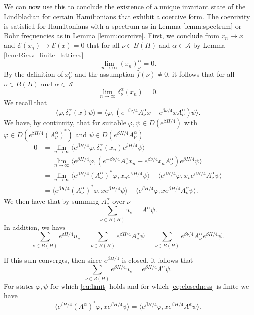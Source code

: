 \documentclass[11pt]{amsart}
\newcommand{\1}{\mathbbm{1}}
\theoremstyle{plain}
\theoremstyle{definition}
\theoremstyle{remark}
\numberwithin{equation}{section}
\begin{document}
We can now use this to conclude the existence of a unique invariant state of the Lindbladian for certain Hamiltonians that exhibit a coercive form. The coercivity is satisfied for Hamiltonians with a spectrum as in Lemma \ref{lemm:spectrum} or Bohr frequencies as in Lemma \ref{lemm:coercive}.  First, we conclude from $x_n \to x$ and $\mathcal E(x_n) \to \mathcal E(x)=0$ that for all $\nu\in B(H)$ and $ \alpha\in\mathcal A$ by Lemma \ref{lem:Riesz_finite_lattices}
\[
\lim_{n \to \infty} (x_n)_\nu^\alpha=0.
\]
By the definition of $x_\nu^\alpha$ and the assumption $\widehat f(\nu)\neq 0$, it follows that for all $\nu\in B(H)$ and $ \alpha\in\mathcal A$
\[
\lim_{n \to \infty} \delta_\nu^\alpha(x_n)=0.
\]
We recall that 
\[
\langle \varphi, \delta_\nu^\alpha(x) \psi\rangle=\langle \varphi, (e^{-\beta \nu/4}A_\nu^\alpha x-e^{\beta \nu/4}xA_\nu^\alpha) \psi\rangle.
\]
We have, by continuity, that for suitable $\varphi,\psi \in D(e^{\beta H/4})$ with $\varphi \in D(e^{\beta H/4} (A_\nu^\alpha)^*)$ and $\psi \in D(e^{\beta H/4} A_\nu^\alpha )$
\begin{equation}
\label{eq:limit}
\begin{split}
0&=\lim_{n \rightarrow \infty} \langle e^{\beta H/4} \varphi, \delta_\nu^\alpha(x_n) e^{\beta H/4}\psi\rangle\\
&=\lim_{n \rightarrow \infty}\langle e^{\beta H/4} \varphi, (e^{-\beta \nu/4}A_\nu^\alpha x_n-e^{\beta \nu/4}x_nA_\nu^\alpha) e^{\beta H/4} \psi\rangle \\
&=\lim_{n \rightarrow \infty}\langle e^{\beta H/4} (A_\nu^\alpha)^* \varphi,  x_ne^{\beta H/4} \psi\rangle-\langle e^{\beta H/4} \varphi, x_n e^{\beta H/4} A_\nu^\alpha \psi\rangle\\
&=\langle e^{\beta H/4} (A_\nu^\alpha)^* \varphi,  xe^{\beta H/4} \psi\rangle-\langle e^{\beta H/4} \varphi, x e^{\beta H/4} A_\nu^\alpha \psi\rangle.
\end{split}
\end{equation}
We then have that by summing $A_\nu^\alpha$ over $\nu$
\[ \sum_{\nu \in B(H)} u_{\nu}= A^{\alpha}\psi. \] 
In addition, we have 
\begin{equation} 
\label{eq:closedness}
\sum_{\nu \in B(H)} e^{\beta H/4}u_{\nu} =  \sum_{\nu \in B(H)}e^{\beta H/4}A_\nu^\alpha  \psi = \sum_{\nu \in B(H)} e^{\beta \nu /4}A_\nu^\alpha  e^{\beta H/4}\psi. 
\end{equation}

If this sum converges, then since $e^{\beta H/4}$ is closed, it follows that 
\[ \sum_{\nu \in B(H)} e^{\beta H/4}u_{\nu} =  e^{\beta H/4} A^{\alpha} \psi. \] 
For states $\varphi,\psi$ for which \eqref{eq:limit} holds and for which \eqref{eq:closedness} is finite we have 
\begin{equation}
\label{eq:comm_relations}
    \langle e^{\beta H/4} (A^\alpha)^* \varphi,  xe^{\beta H/4} \psi\rangle=\langle e^{\beta H/4} \varphi, x e^{\beta H/4} A^\alpha \psi\rangle.
\end{equation}
\end{document}
